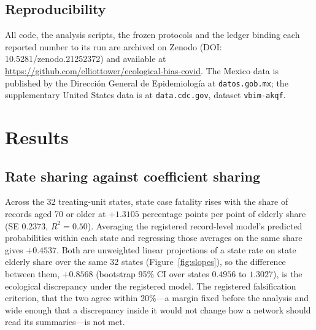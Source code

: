 \documentclass[11pt]{article}
\begin{document}
\subsection{Reproducibility}

\begin{sloppypar}
All code, the analysis scripts, the frozen protocols and the ledger
binding each reported number to its run are archived on Zenodo
(DOI: 10.5281/zenodo.21252372) and available at
\url{https://github.com/elliottower/ecological-bias-covid}.
The Mexico data is published by the Direcci\'{o}n General de
Epidemiolog\'{i}a at \texttt{datos.gob.mx}; the supplementary United
States data is at \texttt{data.cdc.gov}, dataset \texttt{vbim-akqf}.
\end{sloppypar}


\section{Results}

\subsection{Rate sharing against coefficient sharing}

Across the 32 treating-unit states, state case fatality rises with the
share of records aged 70 or older at $+1.3105$ percentage points per
point of elderly share (SE $0.2373$, $R^2 = 0.50$).  Averaging the
registered record-level model's predicted probabilities within each
state and regressing those averages on the same share gives $+0.4537$.
Both are unweighted linear projections of a state rate on state
elderly share over the same 32 states (Figure~\ref{fig:slopes}), so the
difference between them, $+0.8568$ (bootstrap 95\% CI over states
$0.4956$ to $1.3027$), is the ecological discrepancy under the registered model.  The registered
falsification criterion, that the two agree within 20\%---a margin
fixed before the analysis and wide enough that a discrepancy inside it
would not change how a network should read its summaries---is not
met.
\end{document}
